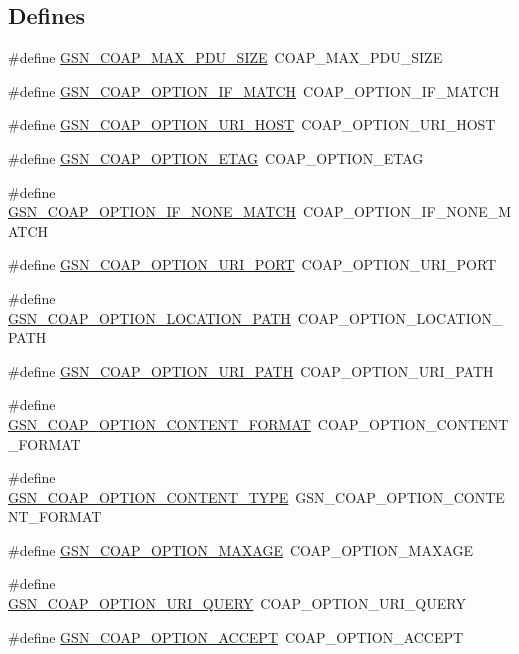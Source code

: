 \subsection*{Defines}
\begin{DoxyCompactItemize}
\item 
\#define \hyperlink{a00538_acc4ca49ca61a25e4f6b3de9c18778f04}{GSN\_\-COAP\_\-MAX\_\-PDU\_\-SIZE}~COAP\_\-MAX\_\-PDU\_\-SIZE
\item 
\#define \hyperlink{a00538_adf035ba37a37f2a207f53e88d7676b8b}{GSN\_\-COAP\_\-OPTION\_\-IF\_\-MATCH}~COAP\_\-OPTION\_\-IF\_\-MATCH
\item 
\#define \hyperlink{a00538_aa1cf57f0a34deaa2bfef8a093d08691d}{GSN\_\-COAP\_\-OPTION\_\-URI\_\-HOST}~COAP\_\-OPTION\_\-URI\_\-HOST
\item 
\#define \hyperlink{a00538_a8030e10c58d5b7729a877e21680dee56}{GSN\_\-COAP\_\-OPTION\_\-ETAG}~COAP\_\-OPTION\_\-ETAG
\item 
\#define \hyperlink{a00538_abf47e54e8c0f72612737e3d7813613bd}{GSN\_\-COAP\_\-OPTION\_\-IF\_\-NONE\_\-MATCH}~COAP\_\-OPTION\_\-IF\_\-NONE\_\-MATCH
\item 
\#define \hyperlink{a00538_adbd1e23ca1ccd52a765b85ec4aa4e102}{GSN\_\-COAP\_\-OPTION\_\-URI\_\-PORT}~COAP\_\-OPTION\_\-URI\_\-PORT
\item 
\#define \hyperlink{a00538_a1a9d0eb2a0cd7f7e6c9af4439de1ba44}{GSN\_\-COAP\_\-OPTION\_\-LOCATION\_\-PATH}~COAP\_\-OPTION\_\-LOCATION\_\-PATH
\item 
\#define \hyperlink{a00538_aa500b59b9d4fcbe031289432e4ca4dde}{GSN\_\-COAP\_\-OPTION\_\-URI\_\-PATH}~COAP\_\-OPTION\_\-URI\_\-PATH
\item 
\#define \hyperlink{a00538_aa19d2afe3a44f4b52b219f5dc38ae596}{GSN\_\-COAP\_\-OPTION\_\-CONTENT\_\-FORMAT}~COAP\_\-OPTION\_\-CONTENT\_\-FORMAT
\item 
\#define \hyperlink{a00538_ac31fe808c646a28285bbfb171de94833}{GSN\_\-COAP\_\-OPTION\_\-CONTENT\_\-TYPE}~GSN\_\-COAP\_\-OPTION\_\-CONTENT\_\-FORMAT
\item 
\#define \hyperlink{a00538_ac65b49ede9c94084cb44f0ae772672ac}{GSN\_\-COAP\_\-OPTION\_\-MAXAGE}~COAP\_\-OPTION\_\-MAXAGE
\item 
\#define \hyperlink{a00538_a36e6d48e2ecaa5b40e85f923196abadc}{GSN\_\-COAP\_\-OPTION\_\-URI\_\-QUERY}~COAP\_\-OPTION\_\-URI\_\-QUERY
\item 
\#define \hyperlink{a00538_a9f67829749b7a93afd48b320975d5c3f}{GSN\_\-COAP\_\-OPTION\_\-ACCEPT}~COAP\_\-OPTION\_\-ACCEPT
\item 

\end{DoxyCompactItemize}
